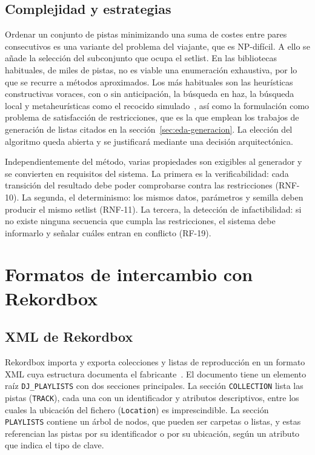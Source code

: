 \subsection{Complejidad y estrategias}

Ordenar un conjunto de pistas minimizando una suma de costes entre pares consecutivos es una variante del problema del viajante, que es NP-difícil. A ello se añade la selección del subconjunto que ocupa el setlist. En las bibliotecas habituales, de miles de pistas, no es viable una enumeración exhaustiva, por lo que se recurre a métodos aproximados. Los más habituales son las heurísticas constructivas voraces, con o sin anticipación, la búsqueda en haz, la búsqueda local y metaheurísticas como el recocido simulado~\cite{kirkpatrick1983optimization}, así como la formulación como problema de satisfacción de restricciones, que es la que emplean los trabajos de generación de listas citados en la sección~\ref{sec:eda-generacion}. La elección del algoritmo queda abierta y se justificará mediante una decisión arquitectónica.

Independientemente del método, varias propiedades son exigibles al generador y se convierten en requisitos del sistema. La primera es la verificabilidad: cada transición del resultado debe poder comprobarse contra las restricciones (RNF-10). La segunda, el determinismo: los mismos datos, parámetros y semilla deben producir el mismo setlist (RNF-11). La tercera, la detección de infactibilidad: si no existe ninguna secuencia que cumpla las restricciones, el sistema debe informarlo y señalar cuáles entran en conflicto (RF-19).

\section{Formatos de intercambio con Rekordbox}
\label{sec:fund-formatos}

\subsection{XML de Rekordbox}

Rekordbox importa y exporta colecciones y listas de reproducción en un formato XML cuya estructura documenta el fabricante~\cite{pyrekordbox_xml}. El documento tiene un elemento raíz \texttt{DJ\_PLAYLISTS} con dos secciones principales. La sección \texttt{COLLECTION} lista las pistas (\texttt{TRACK}), cada una con un identificador y atributos descriptivos, entre los cuales la ubicación del fichero (\texttt{Location}) es imprescindible. La sección \texttt{PLAYLISTS} contiene un árbol de nodos, que pueden ser carpetas o listas, y estas referencian las pistas por su identificador o por su ubicación, según un atributo que indica el tipo de clave.

